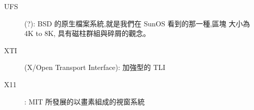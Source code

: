 \documentclass{article}
\begin{document}
\begin{CJK*}{Bg5}{ming}
\begin{description}
    \item [UFS] (?): BSD 的原生檔案系統,就是我們在 SunOS 看到的那一種,區塊
         大小為 4K to 8K, 具有磁柱群組與碎屑的觀念。

    \item [XTI] (X/Open Transport Interface):  加強型的 TLI

    \item [X11]: MIT 所發展的以畫素組成的視窗系統
\end{description}

\end{CJK*}
\end{document}
